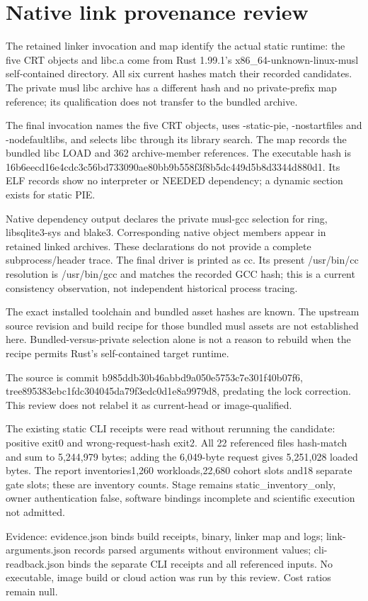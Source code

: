 \documentclass[10pt]{article}
\begin{document}
\section*{Native link provenance review}
The retained linker invocation and map identify the actual static runtime: the five CRT objects and libc.a come from Rust 1.99.1's x86\_64-unknown-linux-musl self-contained directory. All six current hashes match their recorded candidates. The private musl libc archive has a different hash and no private-prefix map reference; its qualification does not transfer to the bundled archive.

The final invocation names the five CRT objects, uses -static-pie, -nostartfiles and -nodefaultlibs, and selects libc through its library search. The map records the bundled libc LOAD and 362 archive-member references. The executable hash is 16b6eecd16e4cdc3c56bd733090ae80bb9b558f3f8b5dc449d5b8d3344d880d1. Its ELF records show no interpreter or NEEDED dependency; a dynamic section exists for static PIE.

Native dependency output declares the private musl-gcc selection for ring, libsqlite3-sys and blake3. Corresponding native object members appear in retained linked archives. These declarations do not provide a complete subprocess/header trace. The final driver is printed as cc. Its present /usr/bin/cc resolution is /usr/bin/gcc and matches the recorded GCC hash; this is a current consistency observation, not independent historical process tracing.

The exact installed toolchain and bundled asset hashes are known. The upstream source revision and build recipe for those bundled musl assets are not established here. Bundled-versus-private selection alone is not a reason to rebuild when the recipe permits Rust's self-contained target runtime.

The source is commit b985ddb30b46abbd9a050e5753c7e301f40b07f6, tree895383ebc1fdc304045da79f3edc0d1e8a9979d8, predating the lock correction. This review does not relabel it as current-head or image-qualified.

The existing static CLI receipts were read without rerunning the candidate: positive exit0 and wrong-request-hash exit2. All 22 referenced files hash-match and sum to 5,244,979 bytes; adding the 6,049-byte request gives 5,251,028 loaded bytes. The report inventories1,260 workloads,22,680 cohort slots and18 separate gate slots; these are inventory counts. Stage remains static\_inventory\_only, owner authentication false, software bindings incomplete and scientific execution not admitted.

Evidence: evidence.json binds build receipts, binary, linker map and logs; link-arguments.json records parsed arguments without environment values; cli-readback.json binds the separate CLI receipts and all referenced inputs. No executable, image build or cloud action was run by this review. Cost ratios remain null.
\end{document}
